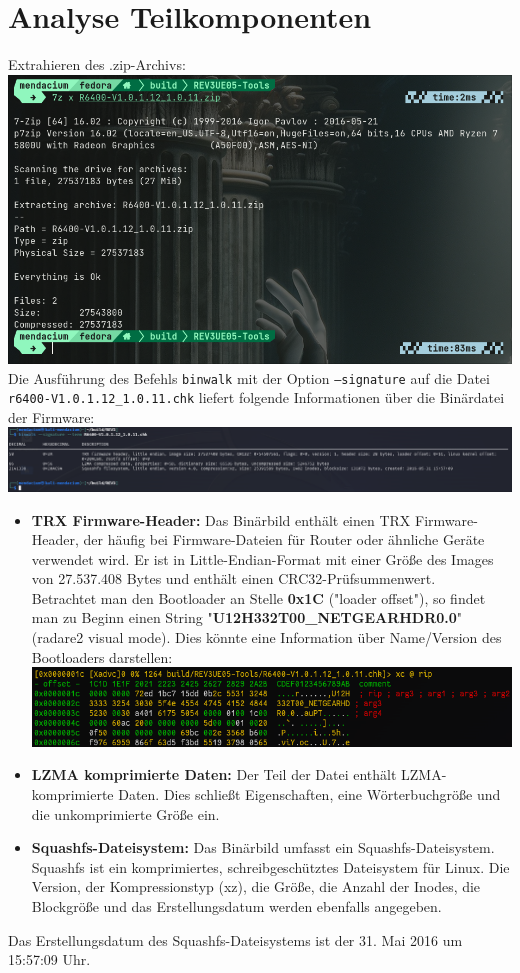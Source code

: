 \documentclass{article}
\begin{document}
	\section*{Analyse Teilkomponenten}
	Extrahieren des .zip-Archivs:\\
	\includegraphics[width=0.5\linewidth]{"pictures/1.1 Extract.png"}\\
	Die Ausführung des Befehls \texttt{binwalk} mit der Option \texttt{--signature} auf die Datei \texttt{r6400-V1.0.1.12\_1.0.11.chk} liefert folgende Informationen über die Binärdatei der Firmware:\\
	\includegraphics[width=1\linewidth]{"pictures/1.2 signature.png"}\\
	\begin{itemize}
		\item \textbf{TRX Firmware-Header:} Das Binärbild enthält einen TRX Firmware-Header, der häufig bei Firmware-Dateien für Router oder ähnliche Geräte verwendet wird. Er ist in Little-Endian-Format mit einer Größe des Images von 27.537.408 Bytes und enthält einen CRC32-Prüfsummenwert.\\
		Betrachtet man den Bootloader an Stelle \textbf{0x1C} ("loader offset"), so findet man zu Beginn einen String "\textbf{U12H332T00\_NETGEARHDR0.0}"(radare2 visual mode). Dies könnte eine Information über Name/Version des Bootloaders darstellen:\\
		\includegraphics[width=0.7\linewidth]{"pictures/1.2.1 bootloader"}
		\item \textbf{LZMA komprimierte Daten:} Der Teil der Datei enthält LZMA-komprimierte Daten. Dies schließt Eigenschaften, eine Wörterbuchgröße und die unkomprimierte Größe ein.
		
		\item \textbf{Squashfs-Dateisystem:} Das Binärbild umfasst ein Squashfs-Dateisystem. Squashfs ist ein komprimiertes, schreibgeschütztes Dateisystem für Linux. Die Version, der Kompressionstyp (xz), die Größe, die Anzahl der Inodes, die Blockgröße und das Erstellungsdatum werden ebenfalls angegeben.
	\end{itemize}
	Das Erstellungsdatum des Squashfs-Dateisystems ist der 31. Mai 2016 um 15:57:09 Uhr.\\
	
\end{document}
